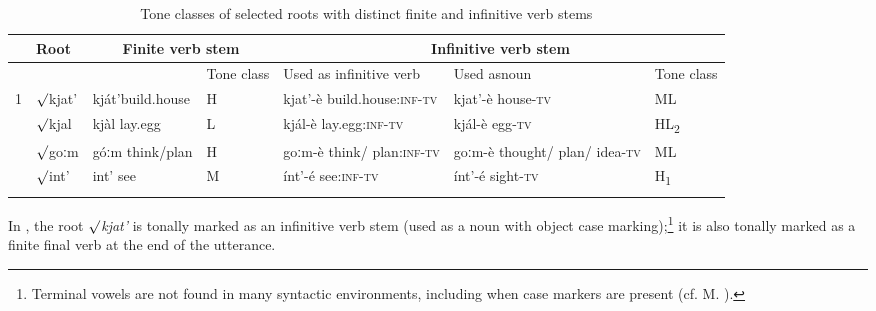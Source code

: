 \documentclass[output=paper]{langsci/langscibook}
\begin{document}
\begin{table}
\caption{Tone classes of selected roots with distinct finite and infinitive verb stems}
\label{tab:mahland:2}
\begin{tabularx}{\textwidth}{l lp{1.5cm}p{.8cm} Xp{1.5cm}p{.8cm}}

\lsptoprule
 & Root & \multicolumn{2}{c}{ Finite verb stem} & \multicolumn{3}{c}{ Infinitive verb stem}\\
\midrule
&  &  & Tone class & Used as \newline infinitive verb & Used as\newline noun\index{Noun} & Tone class\\
\midrule
1 &
 ${\surd}$kjat' &
  kját'\newline build.\newline house &
  H &
  kjat'-è \newline build.house:\textsc{inf-tv} &
  kjat'-è \newline house\textsc{{}-tv} &
  ML
\\
\tablevspace
2 &
  ${\surd}$kjal &
  kjàl \newline lay.egg &
  L &
  kjál-è \newline lay.egg\textsc{:inf-tv} &
  kjál-è \newline  egg\textsc{{}-tv} &
  HL\textsubscript{2}
\\
\tablevspace
3 &
  ${\surd}$goːm &
  góːm \newline  think/plan &
  H &
  goːm-è \newline  think/ plan\textsc{:inf-tv} &
  goːm-è \newline  thought/ plan/ idea\textsc{{}-tv} &
  ML
\\
\tablevspace
4 &
  ${\surd}$int' &
  int' \newline  see &
  M &
  ínt'-é \newline  see\textsc{:inf-tv} &
  ínt'-é \newline  sight\textsc{{}-tv} &
  H\textsubscript{1}\\
\lspbottomrule
\end{tabularx}
\end{table}

In , the root \textit{${\surd}$kjat'} is tonally marked as an infinitive verb stem (used as a noun with object case marking);\footnote{Terminal vowels are not found in many syntactic environments, including when case markers are present (cf. M. \citealt[313]{Ahland2012}).} it is also tonally marked as a finite final verb at the end of the utterance.  
\end{document}
